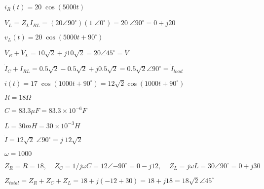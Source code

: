 \documentclass{article}
\def\lthtmlcheckvsize{\ifdim\ht\sizebox<\vsize 
  \ifdim\wd\sizebox<\hsize\expandafter\hfill\fi \expandafter\vfill
  \else\expandafter\vss\fi}%
\begin{document}
{\newpage\clearpage
{}%
$ i_R(t)=20\;\cos(5000t)$%
\lthtmlindisplaymathZ
\lthtmlcheckvsize\clearpage}

{\newpage\clearpage
{}%
$ \dot{V}_L=Z_L\dot{I}_{RL}=(20\angle{90^\circ})(1\;\angle{0^\circ})
  =20\;\angle{90^\circ}=0+j20$%
\lthtmlindisplaymathZ
\lthtmlcheckvsize\clearpage}

{\newpage\clearpage
{}%
$ v_L(t)=20\;\cos(5000t+90^\circ)$%
\lthtmlindisplaymathZ
\lthtmlcheckvsize\clearpage}

{\newpage\clearpage
{}%
$ \dot{V}_R+\dot{V}_L=10\sqrt{2}+j10\sqrt{2}=20\angle{45^\circ}
	=\dot{V}$%
\lthtmlindisplaymathZ
\lthtmlcheckvsize\clearpage}

{\newpage\clearpage
{}%
$ \dot{I}_C+\dot{I}_{RL}=0.5\sqrt{2}-0.5\sqrt{2}+j0.5\sqrt{2}
	=0.5\sqrt{2}\angle{90^\circ}=\dot{I}_{load}$%
\lthtmlindisplaymathZ
\lthtmlcheckvsize\clearpage}

{\newpage\clearpage
{}%
$ i(t)=17\;\cos(1000t+90^\circ)=12\sqrt{2}\cos(1000t+90^\circ)$%
\lthtmlindisplaymathZ
\lthtmlcheckvsize\clearpage}

{\newpage\clearpage
{}%
$ R=18\Omega$%
\lthtmlindisplaymathZ
\lthtmlcheckvsize\clearpage}

{\newpage\clearpage
{}%
$ C=83.3\mu F=83.3\times 10^{-6}F$%
\lthtmlindisplaymathZ
\lthtmlcheckvsize\clearpage}

{\newpage\clearpage
{}%
$ L=30 mH=30\times 
10^{-3}H$%
\lthtmlindisplaymathZ
\lthtmlcheckvsize\clearpage}

{\newpage\clearpage
{}%
$ \dot{I}=12\sqrt{2}\;\angle{90^\circ}
  =j\;12\sqrt{2}$%
\lthtmlindisplaymathZ
\lthtmlcheckvsize\clearpage}

{\newpage\clearpage
{}%
$ \omega=1000$%
\lthtmlindisplaymathZ
\lthtmlcheckvsize\clearpage}

{\newpage\clearpage
{}%
$\displaystyle Z_R=R=18,\;\;\;\;Z_C=1/j\omega C=12\angle{-90^\circ}=0-j12,\;\;\;\;
Z_L=j\omega L=30\angle{90^\circ}=0+j30$%
\lthtmlindisplaymathZ
\lthtmlcheckvsize\clearpage}

{\newpage\clearpage
{}%
$\displaystyle Z_{total}=Z_R+Z_C+Z_L=18+j(-12+30)=18+j18=18\sqrt{2}\angle{45^\circ}$%
\lthtmlindisplaymathZ
\lthtmlcheckvsize\clearpage}
\end{document}
